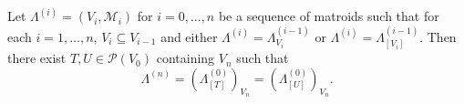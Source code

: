 Let $\Lambda^{(i)} = (V_i, \mathcal{M}_i)$ for $i = 0, \ldots, n$ be a sequence of matroids such that for each $i = 1, \ldots, n$, $V_i \subseteq V_{i-1}$ and either $\Lambda^{(i)} = \Lambda^{(i-1)}_{V_i}$ or $\Lambda^{(i)} = \Lambda^{(i-1)}_{[V_i]}$. Then there exist $T, U \in \mathcal{P}(V_0)$ containing $V_n$ such that
$$\Lambda^{(n)} = (\Lambda^{(0)}_{[T]})_{V_n} = (\Lambda^{(0)}_{[U]})_{V_n}.$$
